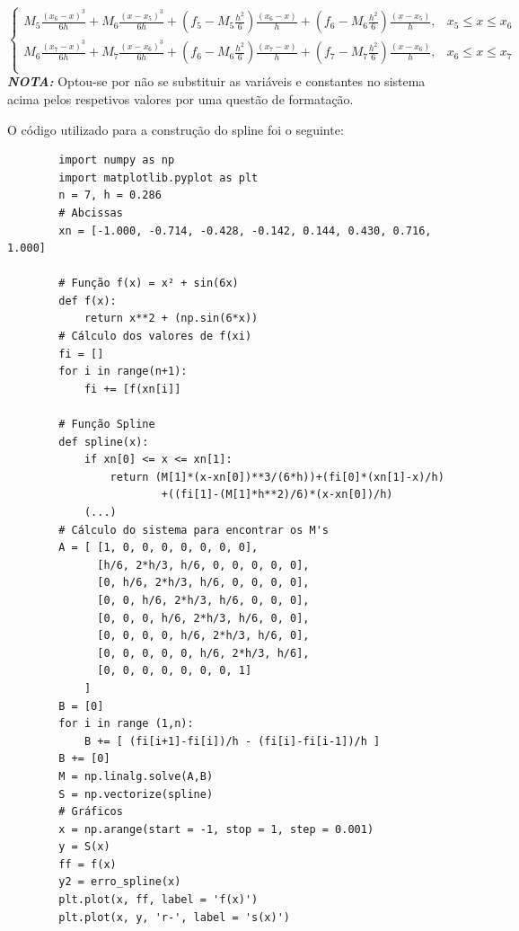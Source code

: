 \documentclass[12pt, letterpaper,fleqn]{article}
\begin{document}
\begin{itemize}
\begin{equation}
\begin{cases}
            M_5\frac{(x_6 - x)^3}{6h} + M_6\frac{(x-x_5)^3}{6h}+(f_5 - M_5\frac{h^2}{6})\frac{(x_6 - x)}{h} + (f_6 - M_6\frac{h^2}{6}) \frac{(x-x_5)}{h}, & x_5 \leq x \leq x_6 \\
            
            M_6\frac{(x_7 - x)^3}{6h} + M_7\frac{(x-x_6)^3}{6h}+(f_6 - M_6\frac{h^2}{6})\frac{(x_7 - x)}{h} + (f_7 - M_7\frac{h^2}{6}) \frac{(x-x_6)}{h}, & x_6 \leq x \leq x_7 \\
        \end{cases}    
    \end{equation}
    \textbf{\textit{NOTA:}} Optou-se por não se substituir as variáveis e constantes no sistema acima pelos respetivos valores por uma questão de formatação.
    
    O código utilizado para a construção do spline foi o seguinte:
    \begin{verbatim}
        import numpy as np
        import matplotlib.pyplot as plt 
        n = 7, h = 0.286
        # Abcissas
        xn = [-1.000, -0.714, -0.428, -0.142, 0.144, 0.430, 0.716, 1.000]
        
        # Função f(x) = x² + sin(6x)
        def f(x):
            return x**2 + (np.sin(6*x))
        # Cálculo dos valores de f(xi)
        fi = []
        for i in range(n+1):
            fi += [f(xn[i]]
        
        # Função Spline
        def spline(x):
            if xn[0] <= x <= xn[1]:
                return (M[1]*(x-xn[0])**3/(6*h))+(fi[0]*(xn[1]-x)/h) 
                        +((fi[1]-(M[1]*h**2)/6)*(x-xn[0])/h)
            (...)
        # Cálculo do sistema para encontrar os M's
        A = [ [1, 0, 0, 0, 0, 0, 0, 0],
              [h/6, 2*h/3, h/6, 0, 0, 0, 0, 0],
              [0, h/6, 2*h/3, h/6, 0, 0, 0, 0],
              [0, 0, h/6, 2*h/3, h/6, 0, 0, 0],
              [0, 0, 0, h/6, 2*h/3, h/6, 0, 0],
              [0, 0, 0, 0, h/6, 2*h/3, h/6, 0],
              [0, 0, 0, 0, 0, h/6, 2*h/3, h/6],
              [0, 0, 0, 0, 0, 0, 0, 1]                                
            ]
        B = [0]
        for i in range (1,n):
            B += [ (fi[i+1]-fi[i])/h - (fi[i]-fi[i-1])/h ]
        B += [0]
        M = np.linalg.solve(A,B)
        S = np.vectorize(spline)
        # Gráficos
        x = np.arange(start = -1, stop = 1, step = 0.001)
        y = S(x)
        ff = f(x)
        y2 = erro_spline(x)
        plt.plot(x, ff, label = 'f(x)')
        plt.plot(x, y, 'r-', label = 's(x)')
    \end{verbatim}


\end{itemize}
\end{document}

